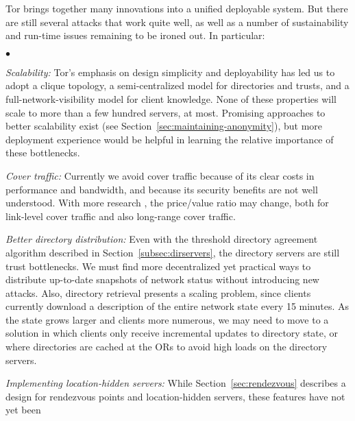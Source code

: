 \documentclass[times,10pt,twocolumn]{article}
\newenvironment{tightlist}{\begin{list}{$\bullet$}{
  \setlength{\itemsep}{0mm}
    \setlength{\parsep}{0mm}
    }}{\end{list}}
\begin{document}
\label{sec:conclusion}

Tor brings together many innovations into
a unified deployable system. But there are still several attacks that
work quite well, as well as a number of sustainability and run-time
issues remaining to be ironed out. In particular:

%
\begin{tightlist}
\item \emph{Scalability:} Tor's emphasis on design simplicity and
  deployability has led us to adopt a clique topology, a
  semi-centralized model for directories and trusts, and a
  full-network-visibility model for client knowledge.  None of these
  properties will scale to more than a few hundred servers, at most.
  Promising approaches to better scalability exist (see
  Section~\ref{sec:maintaining-anonymity}), but more deployment
  experience would be helpful in learning the relative importance of
  these bottlenecks.
\item \emph{Cover traffic:} Currently we avoid cover traffic because
  of its clear costs in performance and bandwidth, and because its
  security benefits are not well understood. With more research
  \cite{SS03,defensive-dropping}, the price/value ratio may change,
  both for link-level cover traffic and also long-range cover traffic.
\item \emph{Better directory distribution:} Even with the threshold
  directory agreement algorithm described in Section~\ref{subsec:dirservers},
  the directory servers are still trust bottlenecks. We must find more
  decentralized yet practical ways to distribute up-to-date snapshots of
  network status without introducing new attacks.  Also, directory
  retrieval presents a scaling problem, since clients currently
  download a description of the entire network state every 15
  minutes.  As the state grows larger and clients more numerous, we
  may need to move to a solution in which clients only receive
  incremental updates to directory state, or where directories are
  cached at the ORs to avoid high loads on the directory servers.
\item \emph{Implementing location-hidden servers:} While
  Section~\ref{sec:rendezvous} describes a design for rendezvous
  points and location-hidden servers, these features have not yet been

\end{tightlist}
\end{document}
